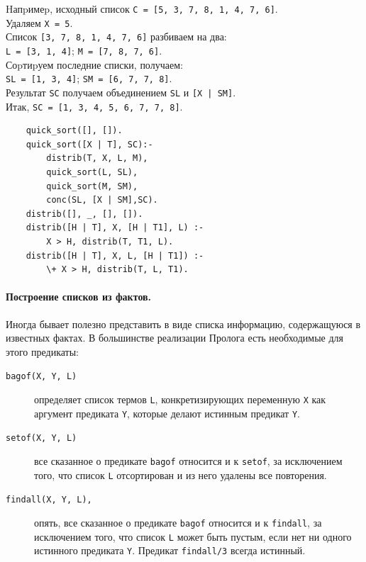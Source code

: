 \documentclass[12pt, openany, twoside]{book} %
\begin{document}
\noindent
       Hапpимеp,  исходный список {\tt С = [5, 3, 7, 8, 1, 4, 7, 6]}. \\ Удаляем {\tt Х = 5}.\\
       Список {\tt [3, 7, 8, 1, 4, 7, 6]} разбиваем на два:\\ {\tt L = [3, 1, 4]};  {\tt M = [7, 8, 7, 6]}.\\
       Соpтиpуем последние списки, получаем:\\ {\tt SL = [1, 3, 4]}; {\tt SM = [6, 7, 7, 8]}.\\
       Результат {\tt SC} получаем объединением {\tt SL} и {\tt [X | SM]}.\\
       Итак, {\tt SC = [1, 3, 4, 5, 6, 7, 7, 8]}.

{\tt\begin{verbatim}
    quick_sort([], []).
    quick_sort([X | T], SC):-
        distrib(T, X, L, M),
        quick_sort(L, SL),
        quick_sort(M, SM),
        conc(SL, [X | SM],SC).
    distrib([], _, [], []).
    distrib([H | T], X, [H | T1], L) :-
        X > H, distrib(T, T1, L).
    distrib([H | T], X, L, [H | T1]) :-
        \+ X > H, distrib(T, L, T1).
\end{verbatim}}

\paragraph{Построение списков из фактов.} Иногда бывает полезно представить в виде списка информацию, содержащуюся в известных фактах. В большинстве реализации Пролога есть необходимые для этого предикаты:
\begin{description}
\item[\normalfont\tt bagof(X, Y, L)] определяет список термов {\tt L}, конкретизирующих переменную {\tt Х} как аргумент предиката {\tt Y}, которые делают истинным предикат {\tt Y}.

\item[\normalfont\tt setof(X, Y, L)] все сказанное о предикате {\tt bagof} относится и к {\tt setof}, за исключением того, что список {\tt L} отсортирован и из него удалены все повторения.

\item[\normalfont\tt findall(X, Y, L),] опять, все сказанное о предикате {\tt bagof} относится и к {\tt findall}, за исключением того, что список {\tt L} может быть пустым, если нет ни одного истинного предиката {\tt Y}. Предикат {\tt findall/3} всегда истинный.
\end{description}
\end{document}
